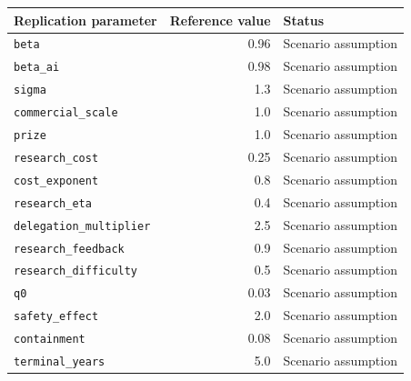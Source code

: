 \begin{tabular}{lrl}
\toprule
Replication parameter & Reference value & Status \\
\midrule
\texttt{beta} & 0.96 & Scenario assumption \\
\texttt{beta\_ai} & 0.98 & Scenario assumption \\
\texttt{sigma} & 1.3 & Scenario assumption \\
\texttt{commercial\_scale} & 1.0 & Scenario assumption \\
\texttt{prize} & 1.0 & Scenario assumption \\
\texttt{research\_cost} & 0.25 & Scenario assumption \\
\texttt{cost\_exponent} & 0.8 & Scenario assumption \\
\texttt{research\_eta} & 0.4 & Scenario assumption \\
\texttt{delegation\_multiplier} & 2.5 & Scenario assumption \\
\texttt{research\_feedback} & 0.9 & Scenario assumption \\
\texttt{research\_difficulty} & 0.5 & Scenario assumption \\
\texttt{q0} & 0.03 & Scenario assumption \\
\texttt{safety\_effect} & 2.0 & Scenario assumption \\
\texttt{containment} & 0.08 & Scenario assumption \\
\texttt{terminal\_years} & 5.0 & Scenario assumption \\
\bottomrule
\end{tabular}
